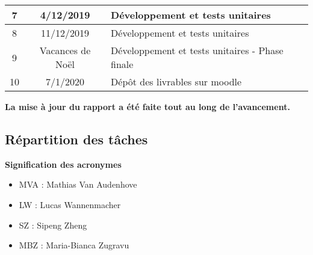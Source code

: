 \begin{table}[h]
\begin{tabular}{|c|c|l|}
7                                                          & 4/12/2019                                                        & Développement et tests unitaires 
                                                                                          \\ \hline
8                                                          & 11/12/2019                                                        & Développement et tests unitaires
                                                                                          \\ \hline
9                                                          & Vacances de Noël                                                        & Développement et tests unitaires - Phase finale 
                                                                                          \\ \hline
10                                                          & 7/1/2020                                                        & Dépôt des livrables sur moodle 
                                                                                          \\ \hline
\end{tabular}
\end{table}

\textbf{La mise à jour du rapport a été faite tout au long de l'avancement.}

\subsection{Répartition des tâches}

\textbf{Signification des acronymes}
\begin{itemize}
  \item MVA : Mathias Van Audenhove
  \item LW : Lucas Wannenmacher
  \item SZ : Sipeng Zheng
  \item MBZ : Maria-Bianca Zugravu
\end{itemize}

